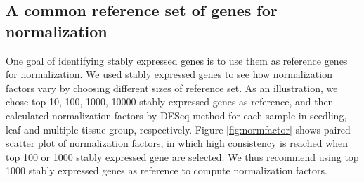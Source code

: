 \documentclass[11pt, a4paper]{article}
\begin{document}
\subsection{A common reference set of genes for normalization}\label{Section:commonReference}
One goal of identifying stably expressed genes is to use them as reference genes for normalization. We used stably expressed genes to see how normalization factors vary by choosing different sizes of reference set.   As an illustration, we chose top 10, 100, 1000, 10000 stably expressed genes as reference, and then calculated normalization factors by DESeq method for each sample in seedling, leaf and multiple-tissue group, respectively. Figure \ref{fig:normfactor} shows paired scatter plot of normalization factors, in which high consistency is reached when top 100 or 1000 stably expressed gene are selected. We thus recommend using top 1000 stably expressed genes as reference to compute normalization factors. %
\end{document}
